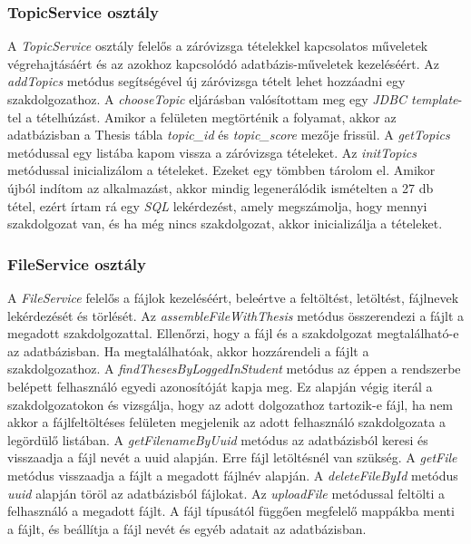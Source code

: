 \subsubsection{TopicService osztály}

A \textit{TopicService} osztály felelős a záróvizsga tételekkel kapcsolatos műveletek végrehajtásáért és az azokhoz kapcsolódó adatbázis-műveletek kezeléséért. Az \textit{addTopics} metódus segítségével új záróvizsga tételt lehet hozzáadni egy szakdolgozathoz. A \textit{chooseTopic} eljárásban valósítottam meg egy \textit{JDBC template}-tel \cite{JdbcTemplate} a tételhúzást. Amikor a felületen megtörténik a folyamat, akkor az adatbázisban a Thesis tábla \textit{topic\_id} és \textit{topic\_score} mezője frissül. A \textit{getTopics} metódussal egy listába kapom vissza a záróvizsga tételeket. Az \textit{initTopics} metódussal inicializálom a tételeket. Ezeket egy tömbben tárolom el. Amikor újból indítom az alkalmazást, akkor mindig legenerálódik ismételten a 27 db tétel, ezért írtam rá egy \textit{SQL} \cite{SQL} lekérdezést, amely megszámolja, hogy mennyi szakdolgozat van, és ha még nincs szakdolgozat, akkor inicializálja a tételeket.

\subsubsection{FileService osztály}

A \textit{FileService} felelős a fájlok kezeléséért, beleértve a feltöltést, letöltést, fájlnevek lekérdezését és törlését. Az \textit{assembleFileWithThesis} metódus összerendezi a fájlt a megadott szakdolgozattal. Ellenőrzi, hogy a fájl és a szakdolgozat megtalálható-e az adatbázisban. Ha megtalálhatóak, akkor hozzárendeli a fájlt a szakdolgozathoz. A \textit{findThesesByLoggedInStudent} metódus az éppen a rendszerbe belépett felhasználó egyedi azonosítóját kapja meg. Ez alapján végig iterál a szakdolgozatokon és vizsgálja, hogy az adott dolgozathoz tartozik-e fájl, ha nem akkor a fájlfeltöltéses felületen megjelenik az adott felhasználó szakdolgozata a legördülő listában. A \textit{getFilenameByUuid} metódus az adatbázisból keresi és visszaadja a fájl nevét a uuid alapján. Erre fájl letöltésnél van szükség. A \textit{getFile} metódus visszaadja a fájlt a megadott fájlnév alapján. A \textit{deleteFileById} metódus \textit{uuid} alapján töröl az adatbázisból fájlokat. Az \textit{uploadFile} metódussal feltölti a felhasználó a megadott fájlt. A fájl típusától függően megfelelő mappákba menti a fájlt, és beállítja a fájl nevét és egyéb adatait az adatbázisban.


